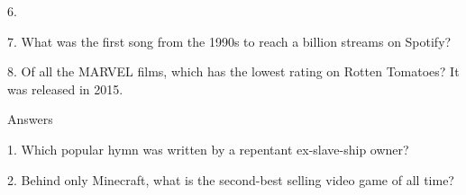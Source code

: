 \begin{frame}
\begin{center}
\Large
6. 
\end{center}
\end{frame}
\begin{frame}
\begin{center}
\Large
7. What was the first song from the 1990s to reach a billion streams on Spotify?
\end{center}
\end{frame}
\begin{frame}
\begin{center}
\Large
8. Of all the MARVEL films, which has the lowest rating on Rotten Tomatoes? It was released in 2015.
\end{center}
\end{frame}
\begin{frame}
\begin{center}
\Huge
Answers
\end{center}
\end{frame}
\begin{frame}
\begin{center}
\Large
1. Which popular hymn was written by a repentant ex-slave-ship owner?
\\
\end{center}
\end{frame}
\begin{frame}
\begin{center}
\Large
2. Behind only Minecraft, what is the second-best selling video game of all time?
\\
\\
\end{center}
\end{frame}
